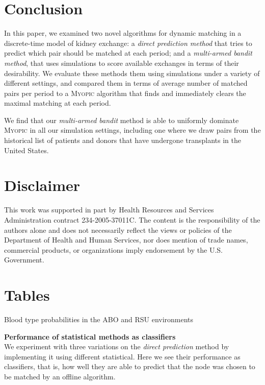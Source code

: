 \section{Conclusion}

In this paper, we examined two novel algorithms for dynamic matching in a discrete-time model of kidney exchange: a \emph{direct prediction method} that tries to predict which pair should be matched at each period; and a \emph{multi-armed bandit method}, that uses simulations to score available exchanges in terms of their desirability. We evaluate these methods them using simulations under a variety of different settings, and compared them in terms of average number of matched pairs per period to a \textsc{Myopic} algorithm that finds and immediately clears the maximal matching at each period.
  
We find that our \emph{multi-armed bandit} method is able to uniformly dominate \textsc{Myopic} in all our simulation settings, including one where we draw pairs from the historical list of patients and donors that have undergone transplants in the United States.

\section*{Disclaimer}

This work was supported in part by Health Resources and Services Administration contract 234-2005-37011C. The content is the responsibility of the authors alone and does not necessarily reflect the views or policies of the Department of Health and Human Services, nor does mention of trade names, commercial products, or organizations imply endorsement by the U.S. Government.

	
\section{Tables}

\begin{table}[H]
  \singlespacing
  \caption{Blood type probabilities in the ABO and RSU environments}
  
  \label{tab:abo_blood_type}
\end{table}



\begin{table}
  \centering
  \singlespacing
  \hspace*{-0.5cm}
  
   \caption[Performance of statistical methods as classifiers]{
   \textbf{Performance of statistical methods as classifiers} \\ 
   We experiment with three variations on the \emph{direct prediction} method by implementing it using different statistical. Here we see their performance as classifiers, that is, how well they are able to predict that the node was chosen to be matched by an offline algorithm. \\
  }
  \label{tab:traditional_ml_classifier}
\end{table}

